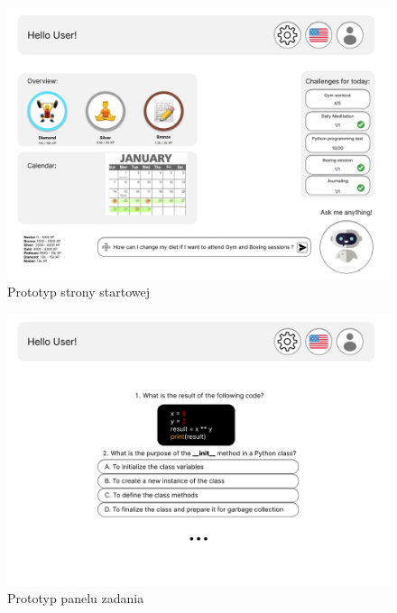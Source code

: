 \begin{figure}[H]
    \centering
    \includegraphics[width=1\textwidth]{Obrazy/prototypy/strona_startowa.png}
    \caption{Prototyp strony startowej}
    \label{fig:my_label}
\end{figure}

\begin{figure}[H]
    \centering
    \includegraphics[width=1\textwidth]{Obrazy/prototypy/panel_zadania.png}
    \caption{Prototyp panelu zadania}
    \label{fig:my_label}
\end{figure}

